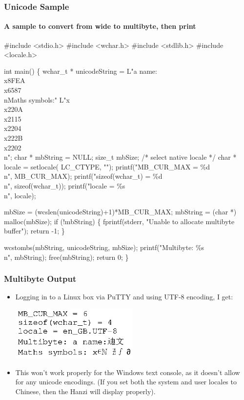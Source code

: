 \documentclass[table]{beamer}
\newif\ifschigh\schighfalse
\newcommand{\kw}[1]{\ifschigh\textcolor{red}{#1}\else\textcolor{keyword}{#1}\fi}
\newcommand{\kt}[1]{\ifschigh\textcolor{red}{#1}\else\textcolor{ctext}{#1}\fi}
\newcommand{\kc}[1]{\ifschigh\textcolor{red}{#1}\else\textcolor{comment}{#1}\fi}
\newcounter{sckll}
\newcommand{\kr}{\setcounter{sckll}{1}}
\newcommand{\kl}{}
\begin{document}
\begin{frame}[fragile]
\frametitle{Unicode Sample}
\framesubtitle{A sample to convert from wide to multibyte, then print}
\vspace{-0.1in}
\begin{semiverbatim}
\tiny
\kr\kl\kw{\#include} \kt{<stdio.h>}
\kl\kw{\#include} \kt{<wchar.h>}
\kl\kw{\#include} \kt{<stdlib.h>}
\kl\kw{\#include} \kt{<locale.h>}
\kl
\kl\kw{int} main()
\kl\{
\kl   \kw{wchar_t} * unicodeString = L\kt{"a name:\\x8FEA\\x6587\\nMaths symbols:"}
\kl                             L\kt{"x\\x220A\\x2115\\x2204\\x222B\\x2202\\n"};
\kl   \kw{char} * mbString = NULL;
\kl   size_t mbSize;
\kl   \kc{/* select native locale */}
\kl   \kw{char} * locale = setlocale( LC_CTYPE, \kt{""});
\kl   printf(\kt{"MB_CUR_MAX = \%d\\n"}, MB_CUR_MAX);
\kl   printf(\kt{"sizeof(wchar_t) = \%d\\n"}, \kw{sizeof}(\kw{wchar_t}));
\kl   printf(\kt{"locale = \%s\\n"}, locale);
\kl
\kl   mbSize = (wcslen(unicodeString)+1)*MB_CUR_MAX;
\kl   mbString = (\kw{char} *) malloc(mbSize);
\kl   \kw{if} (!mbString)
\kl   \{
\kl      fprintf(stderr, \kt{"Unable to allocate multibyte buffer"});
\kl      \kw{return} -1;
\kl   \}
\kl
\kl   wcstombs(mbString, unicodeString, mbSize);
\kl   printf(\kt{"Multibyte: \%s\\n"}, mbString);
\kl   free(mbString); 
\kl   \kw{return} 0;
\kl\}
\end{semiverbatim}
\end{frame}

\begin{frame}
\frametitle{Multibyte Output}
\begin{itemize}
\item Logging in to a Linux box via PuTTY and using UTF-8 encoding, I get:
\begin{center}
\includegraphics[width=0.5\textwidth]{unicodeoutput.eps}
\end{center}
\item This won't work properly for the Windows text console, as it doesn't allow for any unicode encodings. (If you set both the system and user locales to Chinese, then the Hanzi will display properly).
\end{itemize}
\end{frame}
\end{document}

